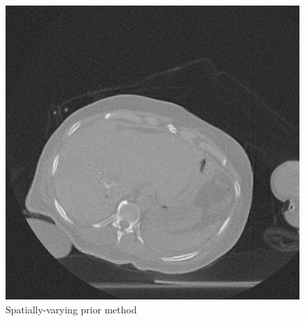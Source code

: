 \documentclass{article}
\begin{document}
\begin{figure}[!h]
\centering
\includegraphics[width=1.2\columnwidth]{../images/tmh/RFA2/few_views/weighted_pca_all_methods_kk_0_01.png}
\captionsetup{labelformat=empty}
\caption[Representative results-2]{\large{Spatially-varying prior method}}
\label{fig:RFA2_few_views_bigger}
\end{figure}
\newpage

\end{document}
